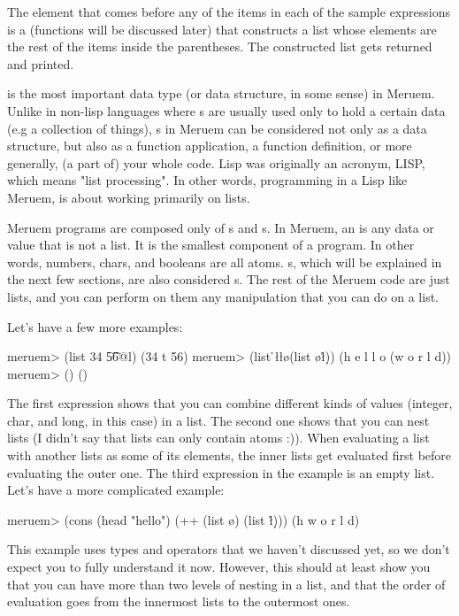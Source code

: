 The  element that comes before any of the items in each of the sample expressions is a  (functions will be discussed later) that constructs a list whose elements are the rest of the items inside the parentheses. The constructed list gets returned and printed.

 is the most important data type (or data structure, in some sense) in Meruem. Unlike in non-lisp languages where s are usually used only to hold a certain data (e.g a collection of things), s in Meruem can be considered not only as a data structure, but also as a function application, a function definition, or more generally, (a part of) your whole code. Lisp was originally an acronym, LISP, which means "list processing". In other words, programming in a Lisp like Meruem, is about working primarily on lists. 

Meruem programs are composed only of s and s. In Meruem, an  is any data or value that is not a list. It is the smallest component of a program. In other words, numbers, chars, and booleans are all atoms. s, which will be explained in the next few sections, are also considered s. The rest of the Meruem code are just lists, and you can perform on them any manipulation that you can do on a list.

Let's have a few more examples:

\begin{REPL}
meruem> (list 34 \t 56@l) 
(34 t 56)
meruem> (list \h \e \l \l \o (list \w \o \r \l \d))
(h e l l o (w o r l d))
meruem> ()
()
\end{REPL}

The first expression shows that you can combine different kinds of values (integer, char, and long, in this case) in a list. The second one shows that you can nest lists (I didn't say that lists can only contain atoms :)). When evaluating a list with another lists as some of its elements, the inner lists get evaluated first before evaluating the outer one. The third expression in the example is an empty list. Let's have a more complicated example:

\begin{REPL}
meruem> (cons (head "hello") (++ (list \w \o) (list \r \l \d)))     
(h w o r l d)
\end{REPL}

This example uses types and operators that we haven't discussed yet, so we don't expect you to fully understand it now. However, this should at least show you that you can have more than two levels of nesting in a list, and that the order of evaluation goes from the innermost lists to the outermost ones.

